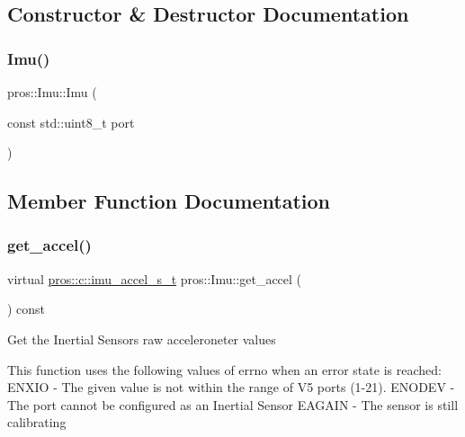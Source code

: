 \subsection{Constructor \& Destructor Documentation}
\mbox{\label{classpros_1_1Imu_aac194322ec0563c1c73f540733e7cc4e}} 
\subsubsection{\texorpdfstring{Imu()}{Imu()}}
{\footnotesize\ttfamily pros\+::\+Imu\+::\+Imu (\begin{DoxyParamCaption}\item[{const std\+::uint8\+\_\+t}]{port }\end{DoxyParamCaption})\hspace{0.3cm}{\ttfamily [inline]}}



\subsection{Member Function Documentation}
\mbox{\label{classpros_1_1Imu_ac9a047f46e7ae8d73a6189091df20150}} 
\subsubsection{\texorpdfstring{get\+\_\+accel()}{get\_accel()}}
{\footnotesize\ttfamily virtual \hyperlink{imu_8h_a70eb3173193f4f46266eade4c243f662}{pros\+::c\+::imu\+\_\+accel\+\_\+s\+\_\+t} pros\+::\+Imu\+::get\+\_\+accel (\begin{DoxyParamCaption}{ }\end{DoxyParamCaption}) const\hspace{0.3cm}{\ttfamily [virtual]}}

Get the Inertial Sensor\textquotesingle{}s raw acceleroneter values

This function uses the following values of errno when an error state is reached\+: E\+N\+X\+IO -\/ The given value is not within the range of V5 ports (1-\/21). E\+N\+O\+D\+EV -\/ The port cannot be configured as an Inertial Sensor E\+A\+G\+A\+IN -\/ The sensor is still calibrating


